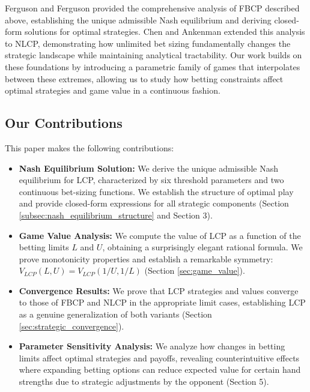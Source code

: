\documentclass[../../main/main.tex]{subfiles}
\begin{document}
Ferguson and Ferguson \cite{ferguson2003borel} provided the comprehensive analysis of FBCP described above, establishing the unique admissible Nash equilibrium and deriving closed-form solutions for optimal strategies. Chen and Ankenman \cite{chen2006mathematics} extended this analysis to NLCP, demonstrating how unlimited bet sizing fundamentally changes the strategic landscape while maintaining analytical tractability. Our work builds on these foundations by introducing a parametric family of games that interpolates between these extremes, allowing us to study how betting constraints affect optimal strategies and game value in a continuous fashion.

\subsection{Our Contributions}

This paper makes the following contributions:

\begin{itemize}
    \item \textbf{Nash Equilibrium Solution:} We derive the unique admissible Nash equilibrium for LCP, characterized by six threshold parameters and two continuous bet-sizing functions. We establish the structure of optimal play and provide closed-form expressions for all strategic components (Section \ref{subsec:nash_equilibrium_structure} and Section 3).

    \item \textbf{Game Value Analysis:} We compute the value of LCP as a function of the betting limits $L$ and $U$, obtaining a surprisingly elegant rational formula. We prove monotonicity properties and establish a remarkable symmetry: $V_{LCP}(L, U) = V_{LCP}(1/U, 1/L)$ (Section \ref{sec:game_value}).

    \item \textbf{Convergence Results:} We prove that LCP strategies and values converge to those of FBCP and NLCP in the appropriate limit cases, establishing LCP as a genuine generalization of both variants (Section \ref{sec:strategic_convergence}).

    \item \textbf{Parameter Sensitivity Analysis:} We analyze how changes in betting limits affect optimal strategies and payoffs, revealing counterintuitive effects where expanding betting options can reduce expected value for certain hand strengths due to strategic adjustments by the opponent (Section 5).
\end{itemize}
\end{document}
